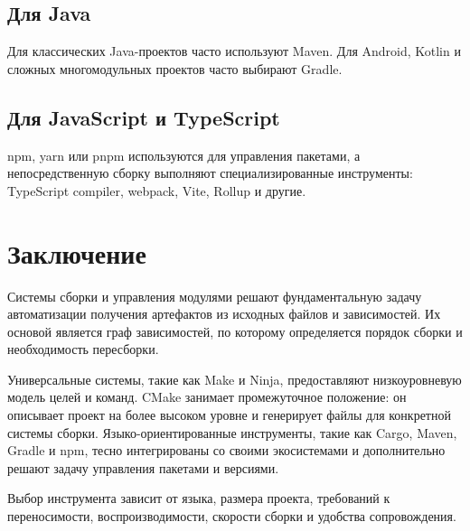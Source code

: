 \documentclass[12pt,a4paper]{article}
\begin{document}
\subsection{Для Java}

Для классических Java-проектов часто используют Maven. Для Android, Kotlin и сложных многомодульных проектов часто выбирают Gradle.

\subsection{Для JavaScript и TypeScript}

npm, yarn или pnpm используются для управления пакетами, а непосредственную сборку выполняют специализированные инструменты: TypeScript compiler, webpack, Vite, Rollup и другие.

\section{Заключение}

Системы сборки и управления модулями решают фундаментальную задачу автоматизации получения артефактов из исходных файлов и зависимостей. Их основой является граф зависимостей, по которому определяется порядок сборки и необходимость пересборки.

Универсальные системы, такие как Make и Ninja, предоставляют низкоуровневую модель целей и команд. CMake занимает промежуточное положение: он описывает проект на более высоком уровне и генерирует файлы для конкретной системы сборки. Языко-ориентированные инструменты, такие как Cargo, Maven, Gradle и npm, тесно интегрированы со своими экосистемами и дополнительно решают задачу управления пакетами и версиями.

Выбор инструмента зависит от языка, размера проекта, требований к переносимости, воспроизводимости, скорости сборки и удобства сопровождения.
\end{document}
